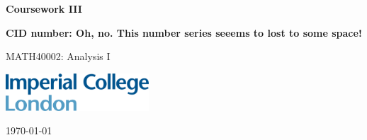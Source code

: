 \documentclass[10pt, a4paper]{article}
\begin{document}
\begin{titlepage}
    \begin{center}
        \vspace*{3cm}
            
        \Huge
        \textbf{
        Coursework III}
            
            
        \vspace{1.5cm}
        \Large
            
        \textbf{
        CID number: Oh, no. This number series seeems to lost to some space!}%
        
            
        \vfill
        
MATH40002: Analysis I
        \vspace{1cm}
            
        \includegraphics[width=0.4\textwidth]{icl_logo.png}
        \\
        
        \Large
        
        \today
            
    \end{center}
\end{titlepage}
\end{document}
